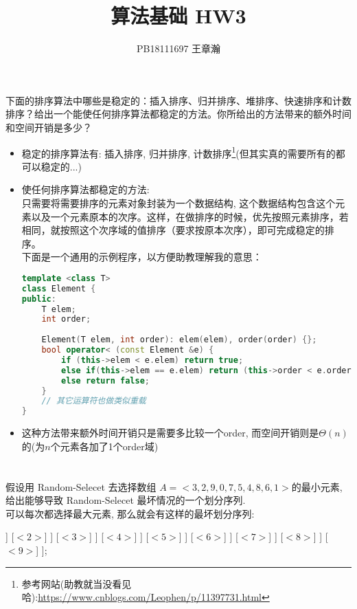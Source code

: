 \documentclass[UTF8]{article}
\title{算法基础 HW3}
\author{PB18111697 王章瀚}
\begin{document}
\maketitle
\section{}
\noindent 下面的排序算法中哪些是稳定的：插入排序、归并排序、堆排序、快速排序和计数排序？给出一个能使任何排序算法都稳定的方法。你所给出的方法带来的额外时间和空间开销是多少？

\begin{itemize}
	\item 稳定的排序算法有: 插入排序, 归并排序, 计数排序\footnote{参考网站(助教就当没看见哈\smiley):\url{https://www.cnblogs.com/Leophen/p/11397731.html}}(但其实真的需要所有的都可以稳定的...)
	\item 使任何排序算法都稳定的方法: \\
	只需要将需要排序的元素对象封装为一个数据结构, 这个数据结构包含这个元素以及一个元素原本的次序。这样，在做排序的时候，优先按照元素排序，若相同，就按照这个次序域的值排序（要求按原本次序），即可完成稳定的排序。\\
	下面是一个通用的示例程序，以方便助教理解我的意思：
	\begin{lstlisting}[language=c++]
template <class T>
class Element {
public:
	T elem;
	int order;
	
	Element(T elem, int order): elem(elem), order(order) {};
	bool operator< (const Element &e) {
		if (this->elem < e.elem) return true;
		else if(this->elem == e.elem) return (this->order < e.order);
		else return false;
	}
	// 其它运算符也做类似重载
}\end{lstlisting}
	\item 这种方法带来额外时间开销只是需要多比较一个order, 而空间开销则是$\Theta(n)$的(为$n$个元素各加了1个order域)
\end{itemize}

\newpage
\section{}
\noindent 假设用 {\sc Random-Selecet} 去选择数组 $A=<3,2,9,0,7,5,4,8,6,1>$的最小元素, 给出能够导致 {\sc Random-Selecet} 最坏情况的一个划分序列.\\

\noindent 可以每次都选择最大元素, 那么就会有这样的最坏划分序列:
\begin{center}
\begin{forest}
	[{$<3,2,9,0,7,5,4,8,6,1>$}
		[{$<3,2,0,7,5,4,8,6,1>$}	
			[{$<3,2,0,7,5,4,6,1>$}
				[{$<3,2,0,5,4,6,1>$}
					[{$<3,2,0,5,4,1>$}
						[{$<3,2,0,4,1>$}
							[{$<3,2,0,1>$}
								[{$<2,0,1>$}
									[{$<0,1>$}
										[{$<0>$}]
										[{$<1>$}]
									]
									[{$<2>$}]
								]
								[{$<3>$}]
							]
							[{$<4>$}]
						]
						[{$<5>$}]
					]
					[{$<6>$}]
				]
				[{$<7>$}]
			]
			[{$<8>$}]
		]
		[{$<9>$}]
	];
\end{forest}
\end{center}
\end{document}
